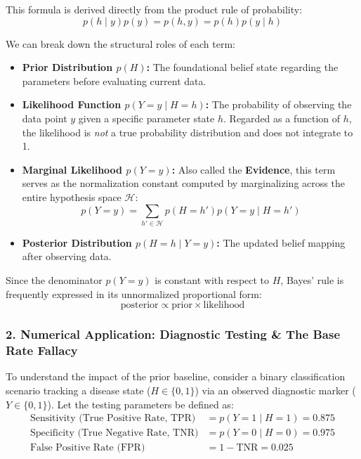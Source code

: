 \documentclass{article}
\begin{document}
This formula is derived directly from the product rule of probability:
\begin{equation}
    p(h \mid y)p(y) = p(h, y) = p(h)p(y \mid h)
\end{equation}

\noindent We can break down the structural roles of each term:
\begin{itemize}
    \item \textbf{Prior Distribution $p(H)$:} The foundational belief state regarding the parameters before evaluating current data.
    \item \textbf{Likelihood Function $p(Y = y \mid H = h)$:} The probability of observing the data point $y$ given a specific parameter state $h$. Regarded as a function of $h$, the likelihood is \textit{not} a true probability distribution and does not integrate to 1.
    \item \textbf{Marginal Likelihood $p(Y = y)$:} Also called the \textbf{Evidence}, this term serves as the normalization constant computed by marginalizing across the entire hypothesis space $\mathcal{H}$:
    \begin{equation}
        \label{eq:marginal_likelihood}
        p(Y = y) = \sum_{h' \in \mathcal{H}} p(H = h') p(Y = y \mid H = h')
    \end{equation}
    \item \textbf{Posterior Distribution $p(H = h \mid Y = y)$:} The updated belief mapping after observing data.
\end{itemize}

Since the denominator $p(Y=y)$ is constant with respect to $H$, Bayes' rule is frequently expressed in its unnormalized proportional form:
\begin{equation}
    \text{posterior} \propto \text{prior} \times \text{likelihood}
\end{equation}

\subsubsection*{2. Numerical Application: Diagnostic Testing \& The Base Rate Fallacy}
To understand the impact of the prior baseline, consider a binary classification scenario tracking a disease state ($H \in \{0,1\}$) via an observed diagnostic marker ($Y \in \{0,1\}$). Let the testing parameters be defined as:
\begin{align*}
    \text{Sensitivity (True Positive Rate, TPR)} &= p(Y=1 \mid H=1) = 0.875 \\
    \text{Specificity (True Negative Rate, TNR)} &= p(Y=0 \mid H=0) = 0.975 \\
    \text{False Positive Rate (FPR)} &= 1 - \text{TNR} = 0.025 
\end{align*}
\end{document}
